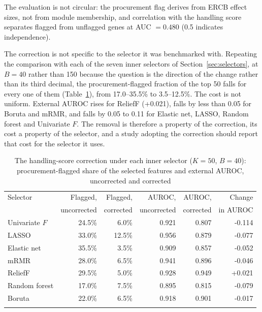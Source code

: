 \documentclass[pdflatex,sn-vancouver-num]{sn-jnl}
\theoremstyle{thmstyleone}
\theoremstyle{thmstyletwo}
\theoremstyle{thmstylethree}
\begin{document}
The evaluation is not circular: the procurement flag derives from ERCB effect sizes, not from
module membership, and correlation with the handling score separates flagged from unflagged genes
at AUC $= 0.480$ (0.5 indicates independence).

The correction is not specific to the selector it was benchmarked with. Repeating the comparison with each of the seven inner selectors of Section~\ref{sec:selectors}, at $B = 40$ rather than 150 because the question is the direction of the change rather than its third decimal, the procurement-flagged fraction of the top 50 falls for every one of them (Table~\ref{tab:sweep}), from 17.0--35.5\% to 3.5--12.5\%. The cost is not uniform. External AUROC rises for ReliefF (+0.021), falls by less than 0.05 for Boruta and mRMR, and falls by 0.05 to 0.11 for Elastic net, LASSO, Random forest and Univariate $F$. The removal is therefore a property of the correction, its cost a property of the selector, and a study adopting the correction should report that cost for the selector it uses.

\begin{table}[h]
\caption{The handling-score correction under each inner selector ($K = 50$, $B = 40$): procurement-flagged share of the selected features and external AUROC, uncorrected and corrected}\label{tab:sweep}
\begin{tabular}{@{}lrrrrr@{}}
\toprule
Selector & Flagged, & Flagged, & AUROC, & AUROC, & Change \\
         & uncorrected & corrected & uncorrected & corrected & in AUROC \\
\midrule
Univariate $F$ & 24.5\% & 6.0\% & 0.921 & 0.807 & -0.114 \\
LASSO & 33.0\% & 12.5\% & 0.956 & 0.879 & -0.077 \\
Elastic net & 35.5\% & 3.5\% & 0.909 & 0.857 & -0.052 \\
mRMR & 28.0\% & 6.5\% & 0.941 & 0.896 & -0.046 \\
ReliefF & 29.5\% & 5.0\% & 0.928 & 0.949 & +0.021 \\
Random forest & 17.0\% & 7.5\% & 0.895 & 0.815 & -0.079 \\
Boruta & 22.0\% & 6.5\% & 0.918 & 0.901 & -0.017 \\
\botrule
\end{tabular}
\end{table}
\end{document}

